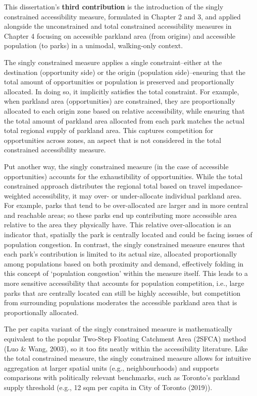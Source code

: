 \documentclass[
11pt, %
oneside, %
english, %
singlespacing, %
]{macthesis} %
\begin{document}
This dissertation's \textbf{third contribution} is the introduction of the singly constrained accessibility measure, formulated in Chapter 2 and 3, and applied alongside the unconstrained and total constrained accessibility measures in Chapter 4 focusing on accessible parkland area (from origins) and accessible population (to parks) in a unimodal, walking-only context.

The singly constrained measure applies a single constraint--either at the destination (opportunity side) or the origin (population side)--ensuring that the total amount of opportunities or population is preserved and proportionally allocated. In doing so, it implicitly satisfies the total constraint. For example, when parkland area (opportunities) are constrained, they are proportionally allocated to each origin zone based on relative accessibility, while ensuring that the total amount of parkland area allocated from each park matches the actual total regional supply of parkland area. This captures competition for opportunities across zones, an aspect that is not considered in the total constrained accessibility measure.

Put another way, the singly constrained measure (in the case of accessible opportunities) accounts for the exhaustibility of opportunities. While the total constrained approach distributes the regional total based on travel impedance-weighted accessibility, it may over- or under-allocate individual parkland area. For example, parks that tend to be over-allocated are larger and in more central and reachable areas; so these parks end up contributing more accessible area relative to the area they physically have. This relative over-allocation is an indicator that, spatially the park is centrally located and could be facing issues of population congestion. In contrast, the singly constrained measure ensures that each park's contribution is limited to its actual size, allocated proportionally among populations based on both proximity and demand, effectively folding in this concept of `population congestion' within the measure itself. This leads to a more sensitive accessibility that accounts for population competition, i.e., large parks that are centrally located can still be highly accessible, but competition from surrounding populations moderates the accessible parkland area that is proportionally allocated.

The per capita variant of the singly constrained measure is mathematically equivalent to the popular Two-Step Floating Catchment Area (2SFCA) method (Luo \& Wang, 2003), so it too fits neatly within the accessibility literature. Like the total constrained measure, the singly constrained measure allows for intuitive aggregation at larger spatial units (e.g., neighbourhoods) and supports comparisons with politically relevant benchmarks, such as Toronto's parkland supply threshold (e.g., 12 sqm per capita in City of Toronto (2019)).
\end{document}
